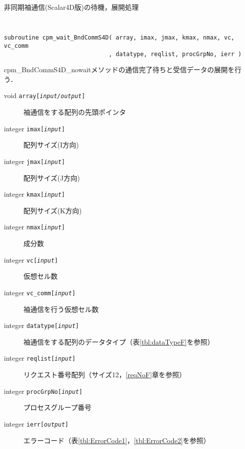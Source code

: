 \begin{spacing}{0.8}
\begin{itembox}[l]{非同期袖通信(Scalar4D版)の待機，展開処理}
{\tt
\begin{verbatim}
subroutine cpm_wait_BndCommS4D( array, imax, jmax, kmax, nmax, vc, vc_comm
                              , datatype, reqlist, procGrpNo, ierr )
\end{verbatim}
}
cpm\_BndCommS4D\_nowaitメソッドの通信完了待ちと受信データの展開を行う．
\begin{description}
\item[void    {\tt array[{\it input/output}]}] 袖通信をする配列の先頭ポインタ
\item[integer {\tt imax[{\it input}]}] 配列サイズ(I方向)
\item[integer {\tt jmax[{\it input}]}] 配列サイズ(J方向)
\item[integer {\tt kmax[{\it input}]}] 配列サイズ(K方向)
\item[integer {\tt nmax[{\it input}]}] 成分数
\item[integer {\tt vc[{\it input}]}] 仮想セル数
\item[integer {\tt vc\_comm[{\it input}]}] 袖通信を行う仮想セル数
\item[integer {\tt datatype[{\it input}]}] 袖通信をする配列のデータタイプ（表\ref{tbl:dataTypeF}を参照）
\item[integer {\tt reqlist[{\it input}]}] リクエスト番号配列（サイズ12，\ref{reqNoF}章を参照）
\item[integer {\tt procGrpNo[{\it input}]}] プロセスグループ番号
\item[integer {\tt ierr[{\it output}]}] エラーコード（表\ref{tbl:ErrorCode1}，\ref{tbl:ErrorCode2}を参照）
\end{description}
\end{itembox}\\
\end{spacing}

